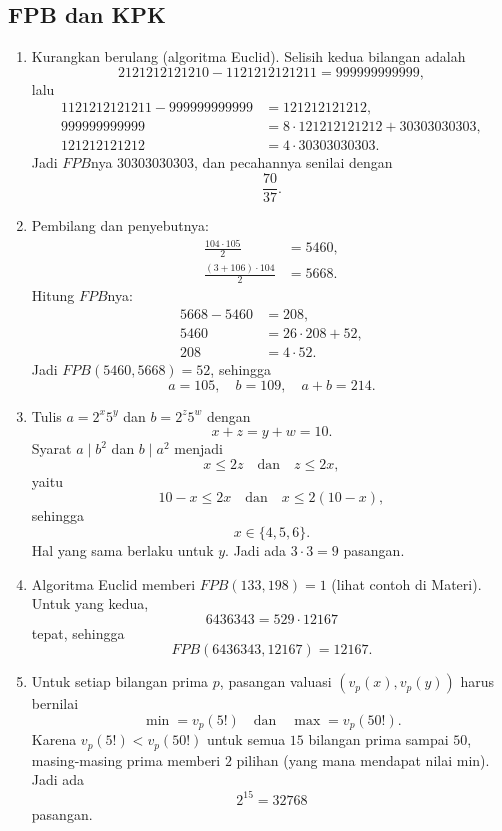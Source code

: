 \documentclass[12pt]{scrartcl}
\begin{document}
\subsection{FPB dan KPK}

\begin{enumerate}[resume]
	\item Kurangkan berulang (algoritma Euclid).
	Selisih kedua bilangan adalah
	\[ 2121212121210 - 1121212121211 = 999999999999, \]
	lalu
	\begin{align*}
	1121212121211 - 999999999999 &= 121212121212, \\
	999999999999 &= 8 \cdot 121212121212 + 30303030303, \\
	121212121212 &= 4 \cdot 30303030303.
	\end{align*}
	Jadi $FPB$nya $30303030303$, dan pecahannya senilai dengan
	\[ \frac{70}{37}. \]

	\item Pembilang dan penyebutnya:
	\begin{align*}
	\frac{104 \cdot 105}{2} &= 5460, \\
	\frac{(3+106) \cdot 104}{2} &= 5668.
	\end{align*}
	Hitung $FPB$nya:
	\begin{align*}
	5668 - 5460 &= 208, \\
	5460 &= 26 \cdot 208 + 52, \\
	208 &= 4 \cdot 52.
	\end{align*}
	Jadi $FPB(5460, 5668) = 52$, sehingga
	\[ a = 105, \quad b = 109, \quad a + b = 214. \]

	\item Tulis $a = 2^x 5^y$ dan $b = 2^z 5^w$ dengan
	\[ x + z = y + w = 10. \]
	Syarat $a \mid b^2$ dan $b \mid a^2$ menjadi
	\[ x \le 2z \quad \text{dan} \quad z \le 2x, \]
	yaitu
	\[ 10 - x \le 2x \quad \text{dan} \quad x \le 2(10 - x), \]
	sehingga
	\[ x \in \{4, 5, 6\}. \]
	Hal yang sama berlaku untuk $y$.
	Jadi ada $3 \cdot 3 = 9$ pasangan.

	\item Algoritma Euclid memberi $FPB(133, 198) = 1$ (lihat contoh di Materi).
	Untuk yang kedua,
	\[ 6436343 = 529 \cdot 12167 \]
	tepat, sehingga
	\[ FPB(6436343, 12167) = 12167. \]

	\item Untuk setiap bilangan prima $p$, pasangan valuasi $(v_p(x), v_p(y))$
	harus bernilai
	\[ \min = v_p(5!) \quad \text{dan} \quad \max = v_p(50!). \]
	Karena $v_p(5!) < v_p(50!)$ untuk semua $15$ bilangan prima sampai $50$,
	masing-masing prima memberi $2$ pilihan (yang mana mendapat nilai min).
	Jadi ada
	\[ 2^{15} = 32768 \]
	pasangan.


\end{enumerate}
\end{document}
